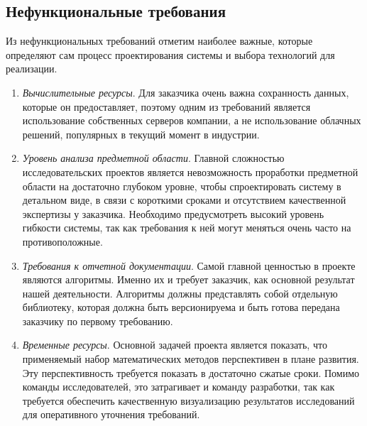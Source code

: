 \subsection*{\large{Нефункциональные требования}}

Из нефункциональных требований отметим наиболее важные, которые определяют сам процесс проектирования системы
и выбора технологий для реализации.

\begin{enumerate}
    \item \textit{Вычислительные ресурсы}. Для заказчика очень важна сохранность данных,
    которые он предоставляет, поэтому одним из требований является использование собственных серверов компании,
    а не использование облачных решений, популярных в текущий момент в индустрии.

    \item \textit{Уровень анализа предметной области}. Главной сложностью исследовательских проектов является
    невозможность проработки предметной области на достаточно глубоком уровне, чтобы спроектировать систему в
    детальном виде, в связи с короткими сроками и отсутствием качественной экспертизы у заказчика. Необходимо
    предусмотреть высокий уровень гибкости системы, так как требования к ней могут меняться очень часто на противоположные.

    \item \textit{Требования к отчетной документации}. Самой главной ценностью в проекте являются алгоритмы. Именно их и
    требует заказчик, как основной результат нашей деятельности. Алгоритмы должны представлять собой отдельную библиотеку,
    которая должна быть версионируема и быть готова передана заказчику по первому требованию.

    \item \textit{Временные ресурсы}. Основной задачей проекта является показать, что применяемый набор математических
    методов перспективен в плане развития. Эту перспективность требуется показать в достаточно сжатые сроки. Помимо
    команды исследователей, это затрагивает и команду разработки, так как требуется обеспечить качественную визуализацию
    результатов исследований для оперативного уточнения требований.
\end{enumerate}
